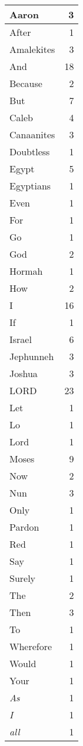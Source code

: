 \begin{center}
\begin{longtable}{l|r}
\hline \hline
\endlastfoot
Aaron & 3 \\ \hline
After & 1 \\ \hline
Amalekites & 3 \\ \hline
And & 18 \\ \hline
Because & 2 \\ \hline
But & 7 \\ \hline
Caleb & 4 \\ \hline
Canaanites & 3 \\ \hline
Doubtless & 1 \\ \hline
Egypt & 5 \\ \hline
Egyptians & 1 \\ \hline
Even & 1 \\ \hline
For & 1 \\ \hline
Go & 1 \\ \hline
God & 2 \\ \hline
Hormah & 1 \\ \hline
How & 2 \\ \hline
I & 16 \\ \hline
If & 1 \\ \hline
Israel & 6 \\ \hline
Jephunneh & 3 \\ \hline
Joshua & 3 \\ \hline
LORD & 23 \\ \hline
Let & 1 \\ \hline
Lo & 1 \\ \hline
Lord & 1 \\ \hline
Moses & 9 \\ \hline
Now & 2 \\ \hline
Nun & 3 \\ \hline
Only & 1 \\ \hline
Pardon & 1 \\ \hline
Red & 1 \\ \hline
Say & 1 \\ \hline
Surely & 1 \\ \hline
The & 2 \\ \hline
Then & 3 \\ \hline
To & 1 \\ \hline
Wherefore & 1 \\ \hline
Would & 1 \\ \hline
Your & 1 \\ \hline
\emph{As} & 1 \\ \hline
\emph{I} & 1 \\ \hline
\emph{all} & 1 \\ \hline

\end{longtable}
\end{center}
